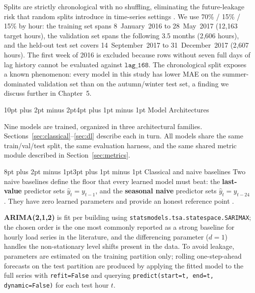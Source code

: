 \documentclass[12pt,a4paper,openany]{report}
\makeatletter
\renewcommand{\section}{\@startsection{section}{1}{\z@}%
  {10pt plus 2pt minus 2pt}{4pt plus 1pt minus 1pt}%
  {\normalfont\normalsize\bfseries}}
\renewcommand{\subsection}{\@startsection{subsection}{2}{\z@}%
  {8pt plus 2pt minus 1pt}{3pt plus 1pt minus 1pt}%
  {\normalfont\normalsize\bfseries}}
\makeatother
\begin{document}
Splits are strictly chronological with no shuffling, eliminating the future-leakage risk that random splits introduce in time-series settings \cite{ref_bergmeir_cv}. We use 70\% / 15\% / 15\% by hour: the training set spans 8~January~2016 to 28~May~2017 (12{,}163 target hours), the validation set spans the following 3.5 months (2{,}606 hours), and the held-out test set covers 14~September~2017 to 31~December~2017 (2{,}607 hours). The first week of 2016 is excluded because rows without seven full days of lag history cannot be evaluated against $\texttt{lag\_168}$. The chronological split exposes a known phenomenon: every model in this study has lower MAE on the summer-dominated validation set than on the autumn/winter test set, a finding we discuss further in Chapter~5.

\section{Model Architectures}

Nine models are trained, organized in three architectural families. Sections~\ref{sec:classical}--\ref{sec:dl} describe each in turn. All models share the same train/val/test split, the same evaluation harness, and the same shared metric module described in Section~\ref{sec:metrics}.

\subsection{Classical and naive baselines}
\label{sec:classical}
Two naive baselines define the floor that every learned model must beat: the \textbf{last-value} predictor sets $\hat y_t = y_{t-1}$, and the \textbf{seasonal naive} predictor sets $\hat y_t = y_{t-24}$. They have zero learned parameters and provide an honest reference point \cite{ref_hyndman_naive}.

\textbf{ARIMA(2,1,2)} is fit per building using \texttt{statsmodels.tsa.statespace.SARIMAX}; the chosen order is the one most commonly reported as a strong baseline for hourly load series in the literature, and the differencing parameter ($d=1$) handles the non-stationary level shifts present in the data. To avoid leakage, parameters are estimated on the training partition only; rolling one-step-ahead forecasts on the test partition are produced by applying the fitted model to the full series with \texttt{refit=False} and querying \texttt{predict(start=t, end=t, dynamic=False)} for each test hour $t$.
\end{document}
